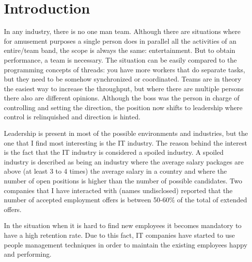 \chapter{Introduction}
\label{chapter:intro}
In any industry, there is no one man team. Although there are situations where for amusement purposes a single person does in parallel all the activities of an entire/team band, the scope is always the same: entertainment. But to obtain performance, a team is necessary. The situation can be easily compared to the programming concepts of threads: you have more workers that do separate tasks, but they need to be somehow synchronized or coordinated. Teams are in theory the easiest way to increase the throughput, but where there are multiple persons there also are different opinions. Although the boss was the person in charge of controlling and setting the direction, the position now shifts to leadership where control is relinquished and direction is hinted.

Leadership is present in most of the possible environments and industries, but the one that I find most interesting is the IT industry. The reason behind the interest is the fact that the IT industry is considered a spoiled industry. A spoiled industry is described as being an industry where the average salary packages are above (at least 3 to 4 times) the average salary in a country and where the number of open positions is higher than the number of possible candidates. Two companies that I have interacted with (names undisclosed) reported that the number of accepted employment offers is between 50-60\% of the total of extended offers. 

In the situation when it is hard to find new employees it becomes mandatory to have a high retention rate. Due to this fact, IT companies have started to use people management techniques in order to maintain the existing employees happy and performing.

